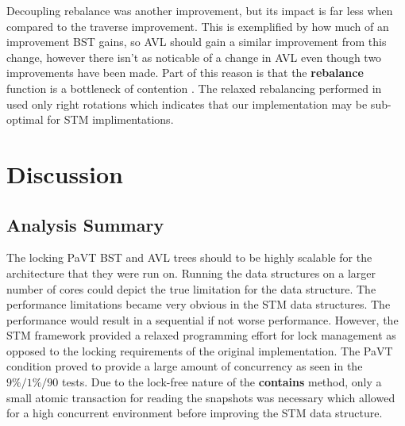 \documentclass[conference]{IEEEtran}
\theoremstyle{definition}
\theoremstyle{theorem}
\begin{document}
Decoupling rebalance was another improvement, but its impact is far less when compared to the traverse improvement. This is exemplified by how much of an improvement BST gains, so AVL should gain a similar improvement from this change, however there isn't as noticable of a change in AVL even though two improvements have been made. Part of this reason is that the \textbf{rebalance} function is a bottleneck of contention \cite{bron}. The relaxed rebalancing performed in \cite{bron} used only right rotations which indicates that our implementation may be sub-optimal for STM implimentations.


\section{Discussion}
\subsection{Analysis Summary}
The locking PaVT BST and AVL trees should to be highly scalable for the architecture that they were run on. Running the data structures on a larger number of cores could depict the true limitation for the data structure. The performance limitations became very obvious in the STM data structures. The performance would result in a sequential if not worse performance. However, the STM framework provided a relaxed programming effort for lock management as opposed to the locking requirements of the original implementation. The PaVT condition proved to provide a large amount of concurrency as seen in the $9\%/1\%/90$ tests. Due to the lock-free nature of the \textbf{contains} method, only a small atomic transaction for reading the snapshots was necessary which allowed for a high concurrent environment before improving the STM data structure. 
\end{document}
